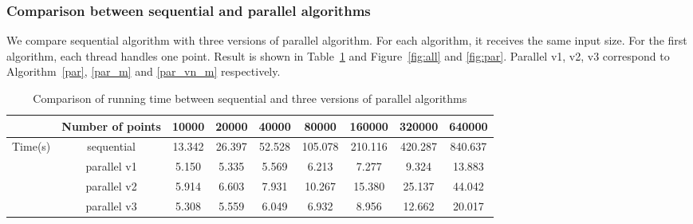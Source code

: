 \subsubsection{Comparison between sequential and parallel algorithms}
We compare sequential algorithm with three versions of parallel algorithm. For each algorithm, it
receives the same input size. 
For the first algorithm, each thread handles one point. Result is shown in
Table~\ref{tab:comparison} and Figure~\ref{fig:all} and \ref{fig:par}. Parallel v1, v2, v3 correspond to
Algorithm~\ref{par}, \ref{par_m} and \ref{par_vn_m} respectively.   
\begin{table}[!h]
  \centering
  \begin{tabular}{|c|c|c|c|c|c|c|c|c|}
    \hline
    {}& Number of points	& 10000	& 20000	& 40000	& 80000	& 160000	& 320000	& 640000 \\
    \hline
    \multirow{4}{*}{Time(s)}	& sequential	& 13.342	& 26.397	& 52.528	& 105.078	& 210.116	& 420.287	& 840.637 \\
    \cline{2-9}
	  & parallel v1	& 5.150	& 5.335	& 5.569	& 6.213	& 7.277	& 9.324	& 13.883 \\
    \cline{2-9}
	  & parallel v2	& 5.914	& 6.603	& 7.931	& 10.267	& 15.380	& 25.137	& 44.042 \\
    \cline{2-9}
	  & parallel v3	& 5.308	& 5.559	& 6.049	& 6.932	& 8.956	& 12.662	& 20.017 \\
    \hline
  \end{tabular}
  \label{tab:comparison}
  \caption{Comparison of running time between sequential and three versions of parallel algorithms}
\end{table}

